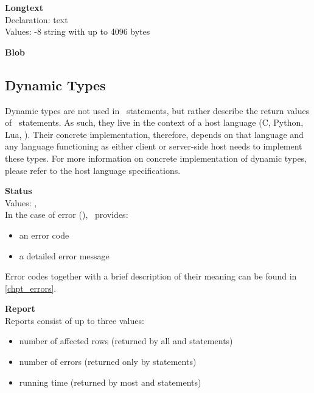 \begin{minipage}{\textwidth}
\textbf{Longtext} \\
Declaration: text \\
Values: -8 string with up to 4096 bytes\\
\end{minipage}

\begin{minipage}{\textwidth}
\textbf{Blob} \\
\end{minipage}

\subsection{Dynamic Types}
Dynamic types are not used in \sql\ statements,
but rather describe the return values of \sql\
statements. As such, they live in the context
of a host language (C, Python, Lua, \etc).
Their concrete implementation, therefore,
depends on that language and any language
functioning as either client or server-side host
needs to implement these types.
For more information on concrete implementation
of dynamic types, please refer to the
host language  specifications.

\begin{minipage}{\textwidth}
\textbf{Status}\\
Values: , \\
In the case of error (\acronym{nok}), \nowdb\ provides:
\begin{itemize}
\item an error code
\item a detailed error message
\end{itemize}
Error codes together with a brief description
of their meaning can be found in \ref{chpt_errors}.
\end{minipage}

\begin{minipage}{\textwidth}
\textbf{Report}\\
Reports consist of up to three values:
\begin{itemize}
\item number of affected rows
(returned by all  and  statements)
\item number of errors
(returned only by  statements)
\item running time
(returned by most  and  statements)
\end{itemize}
\end{minipage}

